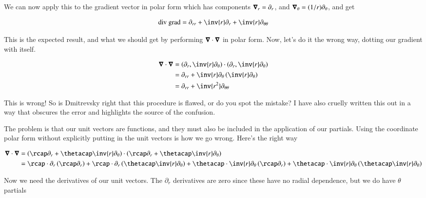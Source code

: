 We can now apply this to the gradient vector in polar form which has components $\boldsymbol{\nabla}_r = \partial_r$, and $\boldsymbol{\nabla}_\theta = (1/r)\partial_\theta$, and get

\begin{align}\label{eqn:divGradCurLap:12}
\text{div}\ \text{grad} = 
\partial_{rr} + \inv{r} \partial_r + \inv{r} \partial_{\theta\theta}
\end{align}

This is the expected result, and what we should get by performing $\boldsymbol{\nabla} \cdot \boldsymbol{\nabla}$ in polar form.  Now, let's do it the wrong way, dotting our gradient with itself.

\begin{align*}
\spacegrad \cdot \spacegrad 
&= \left(\partial_r, \inv{r} \partial_\theta\right) \cdot \left(\partial_r, \inv{r} \partial_\theta\right) \\
&= \partial_{rr} + \inv{r} \partial_\theta \left(\inv{r} \partial_\theta\right) \\
&= \partial_{rr} + \inv{r^2} \partial_{\theta\theta}
\end{align*}

This is wrong!  So is Dmitrevsky right that this procedure is flawed, or do you spot the mistake?  I have also cruelly written this out in a way that obscures the error and highlights the source of the confusion.

The problem is that our unit vectors are functions, and they must also be included in the application of our partials.  Using the coordinate polar form without explicitly putting in the unit vectors is how we go wrong.  Here's the right way

\begin{align*}
\spacegrad \cdot \spacegrad 
&=
\left( \rcap \partial_r + \thetacap \inv{r} \partial_\theta \right) \cdot \left( \rcap \partial_r + \thetacap \inv{r} \partial_\theta \right) \\
&=
\rcap \cdot \partial_r \left(\rcap \partial_r \right)
+\rcap \cdot \partial_r \left( \thetacap \inv{r} \partial_\theta \right)
+\thetacap \cdot \inv{r} \partial_\theta \left( \rcap \partial_r \right)
+\thetacap \cdot \inv{r} \partial_\theta \left( \thetacap \inv{r} \partial_\theta \right) \\
\end{align*}

Now we need the derivatives of our unit vectors.  The $\partial_r$ derivatives are zero since these have no radial dependence, but we do have $\theta$ partials

